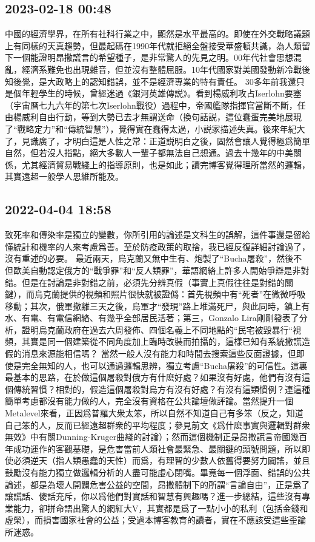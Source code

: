 \documentclass[twocolumn]{ctexart}
\begin{document}
\subsection*{2023-02-18 00:48}

中國的經濟學界，在所有社科行業之中，顯然是水平最高的。即使在外交戰略議題上有同樣的天真趨勢，但最起碼在1990年代就拒絕全盤接受華盛頓共識，為人類留下一個能證明昂撒謊言的希望種子，是非常驚人的先見之明。00年代社會思想混亂，經濟系難免也出現雜音，但並沒有整體屈服。10年代國家對美國發動新冷戰後知後覺，是大政略上的認知錯誤，並不是經濟專業的特有責任。
30多年前我還只是個年輕學生的時候，曾經迷過《銀河英雄傳説》。看到楊威利攻占Iserlohn要塞（宇宙曆七九六年的第七次Iserlohn戰役）過程中，帝國艦隊指揮官當斷不斷，任由楊威利自由行動，等到大勢已去才無謂送命（換句話説，這位蠢蛋完美地展現了“戰略定力”和“傳統智慧”），覺得實在蠢得太過，小説家描述失真。後來年紀大了，見識廣了，才明白這是人性之常：正道説明白之後，固然會讓人覺得極爲簡單自然，但若沒人指點，絕大多數人一輩子都無法自己想通。過去十幾年的中美關係，尤其經濟貿易戰綫上的指導原則，也是如此；讀完博客覺得理所當然的邏輯，其實遠超一般學人思維所能及。
\subsection*{2022-04-04 18:58}

致死率和傳染率是獨立的變數，你所引用的論述是文科生的誤解，這件事還是留給懂統計和機率的人來考慮爲善。至於防疫政策的取捨，我已經反復詳細討論過了，沒有重述的必要。
最近兩天，烏克蘭又無中生有、炮製了“Bucha屠殺”，然後不但歐美自動認定俄方的“戰爭罪”和“反人類罪”，華語網絡上許多人開始爭辯是非對錯。但是在討論是非對錯之前，必須先分辨真假（事實上真假往往是對錯的關鍵），而烏克蘭提供的視頻和照片很快就被證僞：首先視頻中有“死者”在微微呼吸移動；其次，俄軍撤離三天之後，烏軍才“發現”路上堆滿死尸，與此同時，鎮上有水、有電、有電信網絡、有幾乎全部居民活著；第三，Gonzalo Lira剛剛發表了分析，證明烏克蘭政府在過去六周發佈、四個名義上不同地點的“民宅被毀暴行“視頻，其實是同一個建築從不同角度加上臨時改裝而拍攝的，這樣已知有系統撒謊造假的消息來源能相信嗎？
當然一般人沒有能力和時間去搜索這些反面證據，但即使是完全無知的人，也可以通過邏輯思辨，獨立考慮“Bucha屠殺”的可信性。這裏最基本的思路，在於做這個屠殺對俄方有什麽好處？如果沒有好處，他們有沒有這個傳統習慣？相對的，假造這個屠殺對烏方有沒有好處？有沒有這類慣例？連這種簡單考慮都沒有能力做的人，完全沒有資格在公共論壇做評論。當然提升一個Metalevel來看，正因爲普羅大衆太笨，所以自然不知道自己有多笨（反之，知道自己笨的人，反而已經遠超群衆的平均程度；參見前文《爲什麽事實與邏輯對群衆無效》中有關Dunning-Kruger曲綫的討論）；然而這個機制正是昂撒謊言帝國幾百年成功運作的客觀基礎，是危害當前人類社會最緊急、最關鍵的頭號問題，所以即使必須逆天（指人類愚蠢的天性）而爲，有理智的少數人依舊得要努力闢謠，並且鼓勵沒有能力獨立做邏輯分析的人盡可能虛心閉嘴。畢竟每一個浮面、錯誤的公共論述，都是為壞人開闢危害公益的空間，昂撒體制下的所謂“言論自由”，正是爲了讓謊話、傻話充斥，你以爲他們對實話和智慧有興趣嗎？進一步總結，這些沒有專業能力，卻拼命語出驚人的網紅大V，其實都是爲了一點小小的私利（包括金錢和虛榮），而損害國家社會的公益；受過本博客教育的讀者，實在不應該受這些歪論所迷惑。
\end{document}
